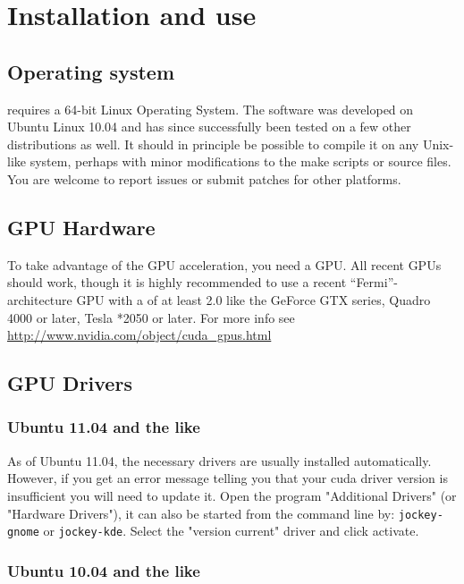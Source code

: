 \section{Installation and use}


\subsection{Operating system}

\mumax requires a 64-bit Linux Operating System. The software was developed on Ubuntu Linux 10.04 and has since successfully been tested on a few other distributions as well. It should in principle be possible to compile it on any Unix-like system, perhaps with minor modifications to the make scripts or source files. You are welcome to report issues or submit patches for other platforms.

\subsection{GPU Hardware}

To take advantage of the GPU acceleration, you need a  \nvidia GPU. All recent \nvidia GPUs should work, though it is highly recommended to use a recent ``Fermi''-architecture GPU with a  of at least 2.0 like the GeForce GTX series, Quadro 4000 or later, Tesla *2050 or later. For more info see \url{http://www.nvidia.com/object/cuda_gpus.html}

\subsection{GPU Drivers}

\subsubsection{Ubuntu 11.04 and the like}

As of Ubuntu 11.04, the necessary drivers are usually installed automatically. However, if you get an error message telling you that your cuda driver version is insufficient you will need to update it. Open the program "Additional Drivers" (or "Hardware Drivers"), it can also be started from the command line by: \texttt{jockey-gnome} or \texttt{jockey-kde}. Select the "version current" driver and click activate.

\subsubsection{Ubuntu 10.04 and the like}


